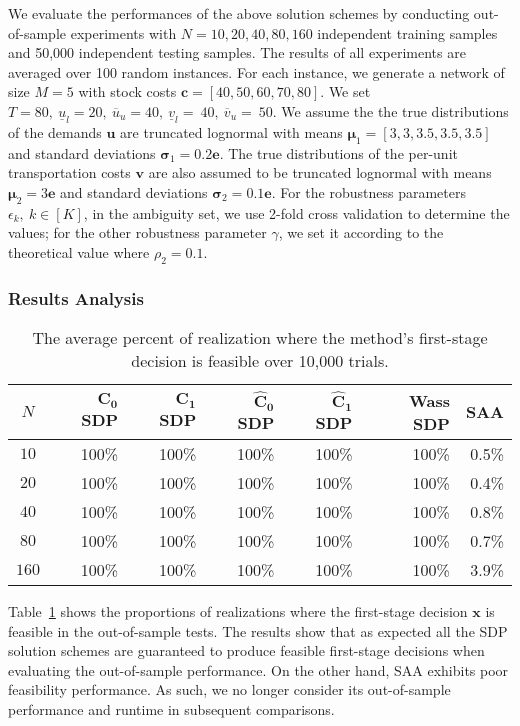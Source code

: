 \documentclass{article}
\begin{document}
We evaluate the performances of the above solution schemes by conducting out-of-sample experiments with $N = 10, 20, 40, 80, 160$ independent training samples and 50,000 independent testing samples. The results of all experiments are averaged over 100 random instances. For each instance, we generate a network of size $M=5$ with stock costs $\bm c = [40,50,60,70,80]$. We set $T = 80, \ \underline{u}_l = 20, \ \overline{u}_u = 40,\  \underline{v}_l =~40, \ \overline{v}_u =~50$. We assume the the true distributions of the demands $\bm u$ are truncated lognormal with means $\bm\mu_1 = [3,3,3.5,3.5,3.5]$ and standard deviations $\bm \sigma_1 = 0.2 \mathbf{e}$. The true distributions of the per-unit transportation costs $\bm v$ are also assumed to be truncated lognormal with  means $\bm\mu_2 = 3 \mathbf{e} $ and standard deviations $\bm \sigma_2 = 0.1\mathbf{e}$. For the robustness parameters $\epsilon_k, \ k \in [K]$, in the ambiguity set, we use 2-fold cross validation to determine the values; for the other robustness parameter $\gamma$, we set it according to the theoretical value where $\rho_2 = 0.1$.

\subsubsection{Results Analysis}

\begin{table}[t!]
\color{black}
\centering
\begin{tabular}{|c|rrrrrr|}\hline
$N$  & \textbf{$\mathbf{C_0}$ SDP} & \textbf{$\mathbf{C_1}$ SDP} & \textbf{$\mathbf{\hat{C}_0}$ SDP} & \textbf{$\mathbf{\hat{C}_1}$ SDP} &  \textbf{Wass SDP}   & \textbf{SAA} \\
[0.0mm] \hline
$10$  & 100\% & 100\% & 100\% & 100\% & 100\% & 0.5\% \\
$20$  & 100\% & 100\% & 100\% & 100\% & 100\% & 0.4\% \\
$40$  & 100\% & 100\% & 100\% & 100\% & 100\% & 0.8\% \\ 
$80$  & 100\% & 100\% & 100\% & 100\% & 100\% & 0.7\% \\
$160$ & 100\% & 100\% & 100\% & 100\% & 100\% & 3.9\% \\
\hline\hline
\end{tabular}
\caption[]{The average percent of realization where the method's first-stage decision is feasible over 10,000 trials.}
\label{tbl:inventory1}
\end{table}

Table~\ref{tbl:inventory1} shows the proportions of realizations where the first-stage decision $\bm x$ is feasible in the out-of-sample tests. %
The results show that as expected all the SDP solution schemes are guaranteed to produce feasible first-stage decisions when evaluating the out-of-sample performance. On the other hand,  SAA exhibits poor feasibility performance. %
As such, we no longer consider its out-of-sample performance and runtime in subsequent comparisons.
\end{document}
